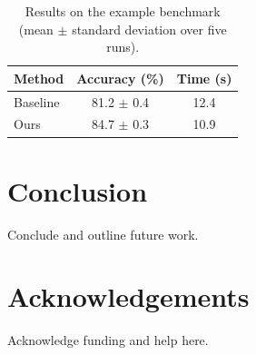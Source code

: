 \documentclass[preprint,12pt]{elsarticle}
\begin{document}
\begin{table}[!htb]
  \caption{Results on the example benchmark (mean $\pm$ standard deviation over five runs).}
  \label{tab:results}
  \centering
  \begin{tabular}{lcc}
    \toprule
    Method   & Accuracy (\%)  & Time (s) \\
    \midrule
    Baseline & 81.2 $\pm$ 0.4 & 12.4     \\
    Ours     & 84.7 $\pm$ 0.3 & 10.9     \\
    \bottomrule
  \end{tabular}
\end{table}

\section{Conclusion}
Conclude and outline future work.

\section*{Acknowledgements}
Acknowledge funding and help here.


\end{document}
